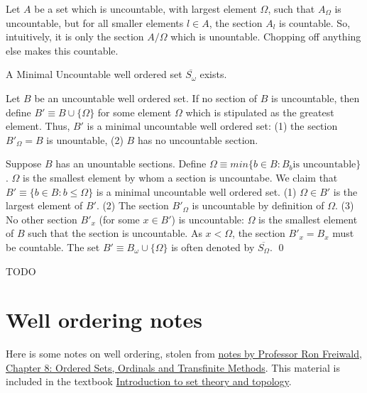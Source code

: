 \documentclass{article}
\begin{document}
Let $A$ be a set which is uncountable, with largest element $\Omega$, such that $A_\Omega$ is uncountable, but for all smaller elements $l \in A$, the section $A_l$ is countable.
So, intuitively, it is only the section $A/\Omega$ which is unountable. Chopping off anything else makes this countable.


 A Minimal Uncountable well ordered set $\overline{S_\omega}$ exists.

 Let $B$ be an uncountable well ordered set. If no section of $B$ is uncountable, then define $B' \equiv B \cup \{ \Omega \}$ for some element $\Omega$ which is
stipulated as the greatest element. Thus, $B'$ is a minimal uncountable well ordered set: (1) the section $B'_\Omega = B$ is unountable, (2) $B$ has no uncountable section.

Suppose $B$ has an unountable sections. Define $\Omega \equiv min \{ b \in B : B_b \text{is uncountable} \}$. $\Omega$ is the
smallest element by whom a section is uncountabe. We claim that $B' \equiv \{ b \in B: b \leq \Omega \}$ is a minimal uncountable well ordered set.
(1) $\Omega \in B'$ is the largest element of $B'$. (2) The section $B'_\Omega$ is uncountable by definition of $\Omega.$ (3) No other section $B'_x$ (for some $x \in B'$) is
uncountable: $\Omega$ is the smallest element of $B$ such that the section is uncountable. As $x < \Omega$, the section $B'_x = B_x$ must be countable.
The set $B' \equiv B_\omega \cup \{ \Omega \}$ is often denoted by $\overline{S_\Omega}$. \qed


TODO

\section{Well ordering notes}

Here is some notes on well ordering, stolen from \href{https://www.math.wustl.edu/~freiwald/ch8.pdf}{notes by Professor Ron Freiwald, Chapter 8: Ordered Sets, Ordinals and Transfinite Methods}. This material is included in the textbook \href{https://openscholarship.wustl.edu/books/20/}{Introduction to set theory and topology}.
\end{document}
